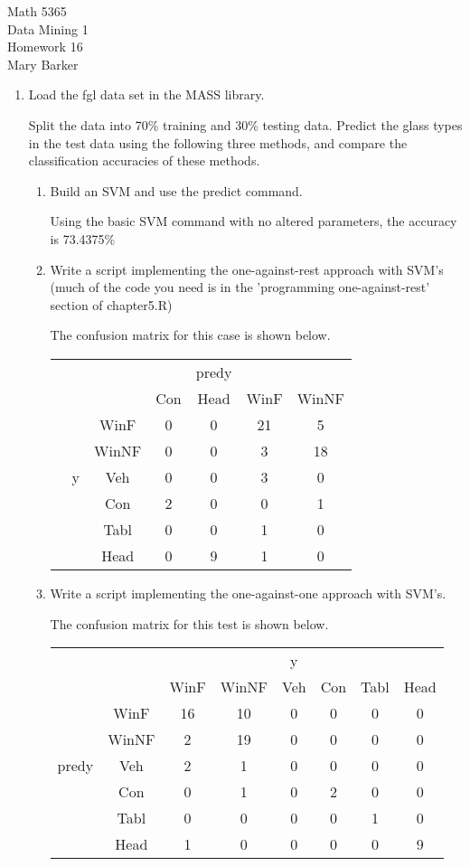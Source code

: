 \documentclass[11pt]{article}
\begin{document}
\noindent\large{Math 5365}\\
\large{Data Mining 1}\\
\large{Homework 16}\\
\large{Mary Barker}
\doublespace
\begin{enumerate}
\item 
Load the fgl data set in the MASS library. 

 Split the data into 70\% training and 30\% testing data. 
 Predict the glass types in the test data using the following
 three methods, and compare the classification accuracies of 
 these methods.


\begin{enumerate}
\item
Build an SVM and use the predict command.

Using the basic SVM command with no altered parameters, the accuracy is 73.4375\%

\item 
 Write a script implementing the one-against-rest approach 
 with SVM's (much of the code you need is in the 'programming
 one-against-rest' section of chapter5.R)

The confusion matrix for this case is shown below. 

\begin{center}
\begin{tabular}{c c c c c c c}
&   &       &     & predy &      & \\
&   &       & Con & Head  & WinF & WinNF \\
&   & WinF  &  0  &  0    &  21  &    5 \\
&   & WinNF &  0  &  0    &   3  &   18 \\
& y & Veh   &  0  &  0    &   3  &    0 \\
&   & Con   &  2  &  0    &   0  &    1 \\
&   & Tabl  &  0  &  0    &   1  &    0 \\
&   & Head  &  0  &  9    &   1  &    0
\end{tabular}
\end{center}


\item
 Write a script implementing the one-against-one approach 
with SVM's.

The confusion matrix for this test is shown below.

\begin{center}
\begin{tabular}{c c c c c c c c}
 & & & & y & & & \\
     &      & WinF  & WinNF & Veh & Con & Tabl & Head \\
      & WinF  & 16 & 10 & 0 & 0 & 0 & 0 \\
      & WinNF & 2  & 19 & 0 & 0 & 0 & 0 \\
predy & Veh   & 2  & 1  & 0 & 0 & 0 & 0 \\
      & Con   & 0  & 1  & 0 & 2 & 0 & 0 \\
      & Tabl  & 0  & 0  & 0 & 0 & 1 & 0 \\
      & Head  & 1  & 0  & 0 & 0 & 0 & 9 
\end{tabular}
\end{center}



\end{enumerate}
\end{enumerate}
\end{document}
